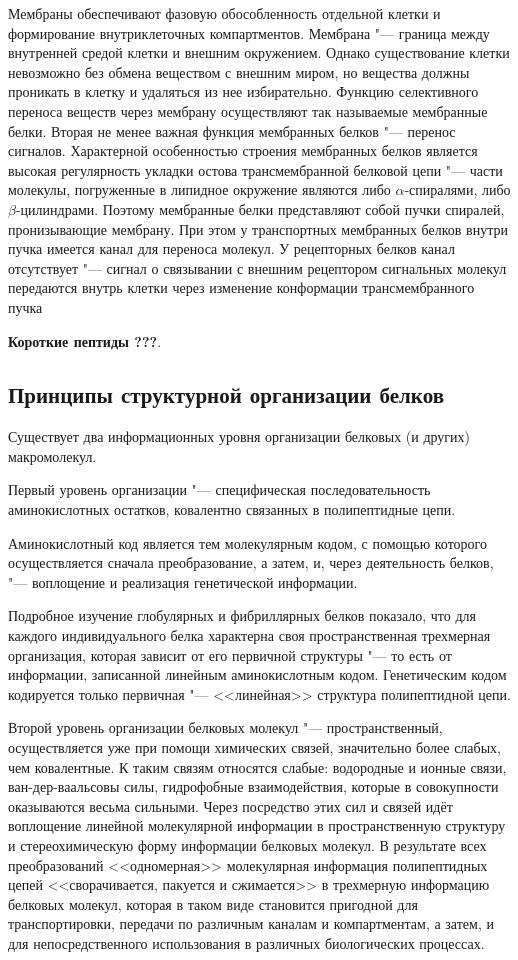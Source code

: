 \documentclass[12pt,a4paper,oneside]{book}
\begin{document}
Мембраны обеспечивают фазовую обособленность отдельной клетки и формирование внутриклеточных компартментов. Мембрана "--- граница между внутренней средой клетки и внешним окружением. Однако существование клетки невозможно без обмена веществом с внешним миром, но вещества должны проникать в клетку и удаляться из нее избирательно. Функцию селективного переноса веществ через мембрану осуществляют так называемые мембранные белки. Вторая не менее важная функция мембранных белков "--- перенос сигналов. Характерной особенностью строения мембранных белков является высокая регулярность укладки остова трансмембранной белковой цепи "--- части молекулы, погруженные в липидное окружение являются либо $\alpha$-спиралями, либо $ \beta $-цилиндрами. Поэтому мембранные белки представляют собой пучки спиралей, пронизывающие мембрану. При этом у транспортных мембранных белков внутри пучка имеется канал для переноса молекул. У рецепторных белков канал отсутствует "--- сигнал о связывании с внешним рецептором сигнальных молекул передаются внутрь клетки через изменение конформации трансмембранного пучка

\textbf{Короткие пептиды ???}.


\subsection{Принципы структурной организации белков}

Существует два информационных уровня организации белковых (и других) макромолекул.

Первый уровень организации "--- специфическая последовательность аминокислотных остатков, ковалентно связанных в полипептидные цепи.

Аминокислотный код является тем молекулярным кодом, с помощью которого осуществляется сначала преобразование, а затем, и, через деятельность белков, "--- воплощение и реализация генетической информации.

Подробное изучение глобулярных и фибриллярных белков показало, что для каждого индивидуального белка характерна своя пространственная трехмерная организация, которая зависит от его первичной структуры "--- то есть от информации, записанной линейным аминокислотным кодом. Генетическим кодом кодируется только первичная "--- <<линейная>> структура полипептидной цепи.

Второй уровень организации белковых молекул "--- пространственный, осуществляется уже при помощи химических связей, значительно более слабых, чем ковалентные. К таким связям относятся слабые: водородные и ионные связи, ван-дер-ваальсовы силы, гидрофобные взаимодействия, которые в совокупности оказываются весьма сильными. Через посредство этих сил и связей идёт воплощение линейной молекулярной информации в пространственную структуру и стереохимическую форму информации белковых молекул. В результате всех преобразований <<одномерная>> молекулярная информация полипептидных цепей <<сворачивается, пакуется и сжимается>> в трехмерную информацию белковых молекул, которая в таком виде становится пригодной для транспортировки, передачи по различным каналам и компартментам, а затем, и для непосредственного использования в различных биологических процессах.
\end{document}
